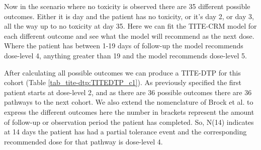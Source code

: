Now in the scenario where no toxicity is observed there are 35 different possible outcomes. Either it is day and the patient has no toxicity, or it's day 2, or day 3, all the way up to no toxicity at day 35. Here we can fit the TITE-CRM model for each different outcome and see what the model will recommend as the next dose. Where the patient has between 1-19 days of follow-up the model recommends dose-level 4, anything greater than 19 and the model recommends dose-level 5.  

After calculating all possible outcomes we can produce a TITE-DTP for this cohort (Table \ref{tab_tite-dtp:TITEDTP_c1}). As previously specified the first patient starts at dose-level 2, and as there are 36 possible outcomes there are 36 pathways to the next cohort. We also extend the nomenclature of Brock et al. \cite{brockImplementingEffToxDosefinding2017} to express the different outcomes here the number in brackets represent the amount of follow-up or observation period the patient has completed. So,  N(14) indicates at 14 days the patient has had a partial tolerance event and the corresponding recommended dose for that pathway is dose-level 4.

